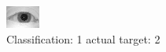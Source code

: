 \begin{figure}[h!]
\begin{center}
\includegraphics[width=0.60\columnwidth]{figures/ID897_class_1_target_2.png}
\end{center}
\caption{ Classification: 1 actual target: 2}
\label{fig:ID897_class_1_target_2}
\end{figure}
